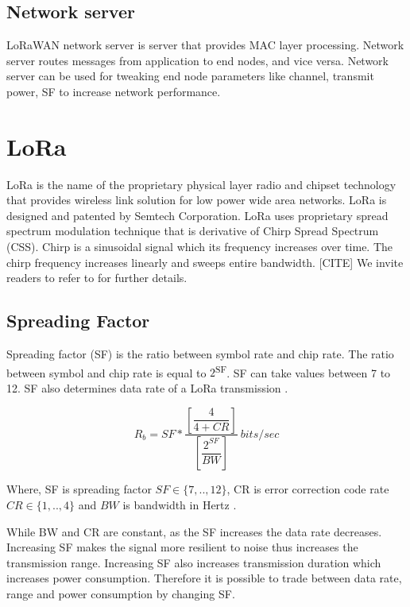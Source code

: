 \documentclass[conference]{IEEEtran}
\begin{document}
\subsection{Network server}
\par LoRaWAN network server is server that provides MAC layer processing. Network server routes messages from application to end nodes, and vice versa. Network server can be used for tweaking end node parameters like channel, transmit power, SF to increase network performance.  


\section{LoRa}
\par LoRa is the name of the proprietary physical layer radio and chipset technology that provides wireless link solution for low power wide area networks. LoRa is designed and patented by Semtech Corporation. LoRa uses proprietary spread spectrum modulation technique that is derivative of Chirp Spread Spectrum (CSS). Chirp is a sinusoidal signal which its  frequency increases over time. The chirp frequency increases linearly and sweeps entire bandwidth. [CITE] We invite readers to refer to \cite{AN1200.22} for further details.

\subsection{Spreading Factor}
\par Spreading factor (SF) is the ratio between symbol rate and chip rate. The ratio between symbol and chip rate is equal to $2$\textsuperscript{SF}. SF can take values between 7 to 12. SF also determines data rate of a LoRa transmission \cite{AN1200.22}.

\begin{equation} \label{eq:bit_rate_sf}
R_{b} = SF * \dfrac{\left[ \dfrac{4}{4+CR} \right] }{ \left[ \dfrac{2^{SF}}{BW} \right]} \ bits/sec
\end{equation}

Where, SF is spreading factor $SF \in \{7,..,12\}$, CR is error correction code rate $CR \in \{1,..,4\}$ and $BW$ is bandwidth in Hertz \cite{AN1200.22}.

\par While BW and CR are constant, as the SF increases the data rate decreases. Increasing SF makes the signal more resilient to noise thus increases the transmission range. Increasing SF also increases transmission duration which increases power consumption. Therefore it is possible to trade between data rate, range and power consumption by  changing SF.
\end{document}
